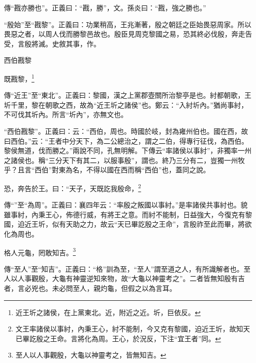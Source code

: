 {\noindent\zhuan{}\fzbyks 傳“戡亦勝也”。正義曰：“戡，勝”，文。孫炎曰：“戡，強之勝也。” \par}

{\noindent\shu{}\fzkt “殷始”至“戡黎”。正義曰：功業稍高，王兆漸著，殷之朝廷之臣始畏惡周家。所以畏惡之者，以周人伐而勝黎邑故也。殷臣見周克黎國之易，恐其終必伐殷，奔走告受，言殷將滅。史敘其事，作。 \par}

西伯戡黎

既戡黎，\footnote{近王圻之諸侯，在上黨東北。近，附近之近。圻，巨依反。}


{\noindent\zhuan{}\fzbyks 傳“近王”至“東北”。正義曰：黎國，漢之上黨郡壺關所治黎亭是也。紂都朝歌，王圻千里，黎在朝歌之西，故為“近王圻之諸侯”也。鄭云：“入紂圻內。”猶尚事紂，不可伐其圻內。所言“圻內”，亦無文也。 \par}

{\noindent\shu{}\fzkt “西伯戡黎”。正義曰：云：“西伯，周也。時國於岐，封為雍州伯也。國在西，故曰西伯。”云：“王者中分天下，為二公總治之，謂之二伯，得專行征伐，為西伯。黎侯無道，伐而勝之。”兩說不同，孔無明解。下傳云“率諸侯以事紂”，非獨率一州之諸侯也。稱“三分天下有其二，以服事殷”，謂也。終乃三分有二，豈獨一州牧乎？且言“西伯”對東為名，不得以國在西而稱“西伯”也，蓋同之說。 \par}

恐，奔告於王。曰：“天子，天既訖我殷命，\footnote{文王率諸侯以事紂，內秉王心，紂不能制，今又克有黎國，迫近王圻，故知天已畢訖殷之王命。言將化為周。王心，於況反，下注“宜王者”同。}

{\noindent\zhuan{}\fzbyks 傳“”至“為周”。正義曰：襄四年云：“率殷之叛國以事紂。”是率諸侯共事紂也。貌雖事紂，內秉王心，佈德行威，有將王之意。而紂不能制，日益強大，今復克有黎國，迫近王圻，似有天助之力，故云“天已畢訖殷之王命”，言殷祚至此而畢，將欲化為周也。 \par}

格人元龜，罔敢知吉。\footnote{至人以人事觀殷，大龜以神靈考之，皆無知吉。}

{\noindent\zhuan{}\fzbyks 傳“至人”至“知吉”。正義曰：“格”訓為至，“至人”謂至道之人，有所識解者也。至人以人事觀殷，大龜有神靈逆知來物，故“大龜以神靈考之”。二者皆無知殷有吉者，言必兇也。未必問至人，親灼龜，但假之以為言耳。 \par}

